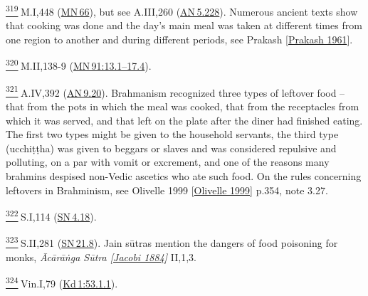 \label{footprints_split_024.html_fn319}
\hyperref[footprints_split_011.htmlux5cux23fnref319]{\textsuperscript{319}} M.I,448
(\href{https://suttacentral.net/mn66/en/sujato}{MN\,66}), but see
A.III,260
(\href{https://suttacentral.net/an5.228/en/sujato}{AN\,5.228}). Numerous
ancient texts show that cooking was done and the day's main meal was
taken at different times from one region to another and during different
periods, see {Prakash
{{[}\hyperref[footprints_split_022.htmlux5cux23Prakashux5cux25201961]{Prakash
1961}{]}}}.

\label{footprints_split_024.html_fn320}
\hyperref[footprints_split_011.htmlux5cux23fnref320]{\textsuperscript{320}} M.II,138-9
(\href{https://suttacentral.net/mn91/en/sujato\#13.1}{MN\,91:13.1--17.4}).

\label{footprints_split_024.html_fn321}
\hyperref[footprints_split_011.htmlux5cux23fnref321]{\textsuperscript{321}} A.IV,392
(\href{https://suttacentral.net/an9.20/en/sujato}{AN\,9.20}). Brahmanism
recognized three types of leftover food -- that from the pots in which
the meal was cooked, that from the receptacles from which it was served,
and that left on the plate after the diner had finished eating. The
first two types might be given to the household servants, the third type
(ucchiṭṭha) was given to beggars or slaves and was considered repulsive
and polluting, on a par with vomit or excrement, and one of the reasons
many brahmins despised non-Vedic ascetics who ate such food. On the
rules concerning leftovers in Brahminism, see {Olivelle 1999
{{[}\hyperref[footprints_split_022.htmlux5cux23Olivelleux5cux25201999]{Olivelle
1999}{]}}} p.354, note 3.27.

\label{footprints_split_024.html_fn322}
\hyperref[footprints_split_011.htmlux5cux23fnref322]{\textsuperscript{322}} S.I,114
(\href{https://suttacentral.net/sn4.18/en/sujato}{SN\,4.18}).

\label{footprints_split_024.html_fn323}
\hyperref[footprints_split_011.htmlux5cux23fnref323]{\textsuperscript{323}} S.II,281
(\href{https://suttacentral.net/sn21.8/en/sujato}{SN\,21.8}). Jain
sūtras mention the dangers of food poisoning for monks, \emph{{Ācārāṅga
Sūtra
{{[}\hyperref[footprints_split_022.htmlux5cux23Jacobiux5cux25201884]{Jacobi
1884}{]}}}} II,1,3.

\label{footprints_split_024.html_fn324}
\hyperref[footprints_split_011.htmlux5cux23fnref324]{\textsuperscript{324}} Vin.I,79
(\href{https://suttacentral.net/pli-tv-kd1/en/brahmali\#53.1.1}{Kd\,1:53.1.1}).

